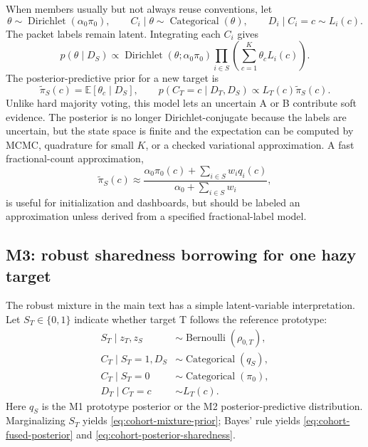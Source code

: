 \documentclass[11pt]{article}
\begin{document}
    When members usually but not always reuse conventions, let
    \begin{equation}
        \theta\sim\operatorname{Dirichlet}(\alpha_0\pi_0),
        \qquad
        C_i\mid\theta\sim\operatorname{Categorical}(\theta),
        \qquad
        D_i\mid C_i=c\sim L_i(c).
        \label{eq:cohort-m2-model}
    \end{equation}
    The packet labels remain latent. Integrating each $C_i$ gives
    \begin{equation}
        p(\theta\mid D_S)
        \propto
        \operatorname{Dirichlet}(\theta;\alpha_0\pi_0)
        \prod_{i\in S}\left(\sum_{c=1}^{K}\theta_c L_i(c)\right).
        \label{eq:cohort-m2-posterior}
    \end{equation}
    The posterior-predictive prior for a new target is
    \begin{equation}
        \widetilde\pi_S(c)
        =\mathbb E[\theta_c\mid D_S],
        \qquad
        p(C_T=c\mid D_T,D_S)
        \propto L_T(c)\widetilde\pi_S(c).
        \label{eq:cohort-m2-predictive}
    \end{equation}
    Unlike hard majority voting, this model lets an uncertain A or B contribute soft evidence.
    The posterior is no longer Dirichlet-conjugate because the labels are uncertain, but the
    state space is finite and the expectation can be computed by MCMC, quadrature for small
    $K$, or a checked variational approximation. A fast fractional-count approximation,
    \begin{equation}
        \widetilde\pi_S(c)
        \approx
        \frac{\alpha_0\pi_0(c)+\sum_{i\in S}w_i q_i(c)}
        {\alpha_0+\sum_{i\in S}w_i},
        \label{eq:cohort-fractional-count}
    \end{equation}
    is useful for initialization and dashboards, but should be labeled an approximation
    unless derived from a specified fractional-label model.

    \subsection{M3: robust sharedness borrowing for one hazy target}

    The robust mixture in the main text has a simple latent-variable interpretation. Let
    $S_T\in\{0,1\}$ indicate whether target T follows the reference prototype:
    \begin{equation}
        \begin{aligned}
            S_T\mid z_T,z_S&\sim\operatorname{Bernoulli}(\rho_{0,T}),\\
            C_T\mid S_T=1,D_S&\sim\operatorname{Categorical}(q_S),\\
            C_T\mid S_T=0&\sim\operatorname{Categorical}(\pi_0),\\
            D_T\mid C_T=c&\sim L_T(c).
        \end{aligned}
        \label{eq:cohort-m3-model}
    \end{equation}
    Here $q_S$ is the M1 prototype posterior or the M2 posterior-predictive distribution.
    Marginalizing $S_T$ yields \eqref{eq:cohort-mixture-prior}; Bayes' rule yields
    \eqref{eq:cohort-fused-posterior} and \eqref{eq:cohort-posterior-sharedness}.
\end{document}
